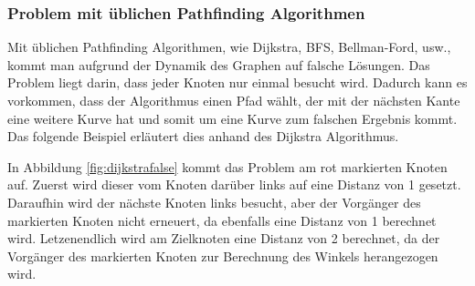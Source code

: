 \documentclass[a4paper,10pt,ngerman]{scrartcl}
\begin{document}
\subsubsection{Problem mit üblichen Pathfinding Algorithmen}
Mit üblichen Pathfinding Algorithmen, wie Dijkstra, BFS, Bellman-Ford, usw., kommt man aufgrund der Dynamik des Graphen auf falsche Lösungen.
Das Problem liegt darin, dass jeder Knoten nur einmal besucht wird. Dadurch kann es vorkommen, dass der Algorithmus einen Pfad wählt, der
mit der nächsten Kante eine weitere Kurve hat und somit um eine Kurve zum falschen Ergebnis kommt. Das folgende Beispiel erläutert dies anhand
des Dijkstra Algorithmus.

In Abbildung \ref{fig:dijkstrafalse} kommt das Problem am rot markierten Knoten auf. Zuerst wird dieser vom Knoten darüber links
auf eine Distanz von 1 gesetzt. Daraufhin wird der nächste Knoten links besucht, aber der Vorgänger des markierten Knoten nicht erneuert, da ebenfalls eine
Distanz von 1 berechnet wird. Letzenendlich wird am Zielknoten eine Distanz von 2 berechnet,
da der Vorgänger des markierten Knoten zur Berechnung des Winkels herangezogen wird.
\end{document}
